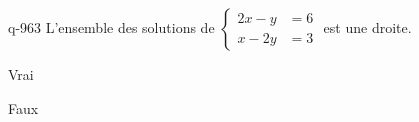 \begin{truefalse}{q-963}
L'ensemble des solutions de $\begin{cases}2x-y &= 6 \\ x-2y &= 3\end{cases}$ est une droite.
\item Vrai
\item* Faux
\end{truefalse}


